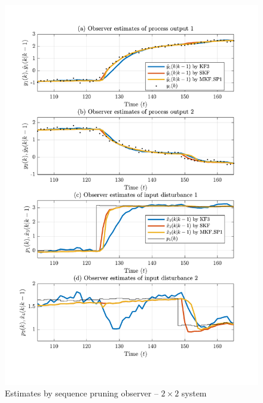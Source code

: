 \begin{figure}[htp]
	\centering
	\includegraphics[width=13cm]{images/rod_obs_sim2_all_seed_y_est2_SP1.pdf}
	\caption{Estimates by sequence pruning observer –  $2\times2$ system}
	\label{fig:rod-obs-sim2-yest-2-SF}
\end{figure}

